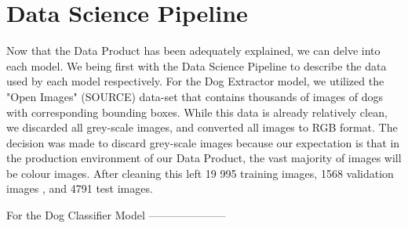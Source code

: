 \documentclass{article}
\begin{document}
\section{Data Science Pipeline}

Now that the Data Product has been adequately explained, we can delve into each model.  We being first with the Data Science Pipeline to describe the data used by each model respectively.  For the Dog Extractor model, we utilized the "Open Images" (SOURCE) data-set that contains thousands of images of dogs with corresponding bounding boxes.  While this data is already relatively clean, we discarded all grey-scale images, and converted all images to RGB format.  The decision was made to discard grey-scale images because our expectation is that in the production environment of our Data Product, the vast majority of images will be colour images.  After cleaning this left 19 995 training images, 1568 validation images , and 4791 test images.

For the Dog Classifier Model ---------------------
\end{document}
